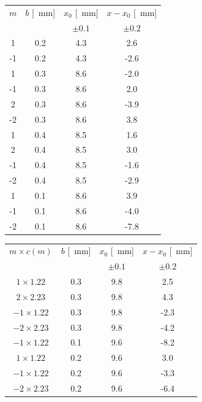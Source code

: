 \documentclass[10pt,oneside,a4paper]{article}
\begin{document}
\begin{minipage}[t]{.5\linewidth}
\vspace{0cm}
\begin{center}
\label{tab:misuraLambda1}
\begin{tabular}{c|c|c|c}
$m$ & $b$ [\SI{}{mm}] & $x_0$ [\SI{}{mm}] & $x-x_0$ [\SI{}{mm}]\\
 & & $\pm 0.1$ & $\pm 0.2$\\
\hline
  1 & 0.2 & 4.3 &  2.6 \\
 -1 & 0.2 & 4.3 & -2.6 \\
  1 & 0.3 & 8.6 & -2.0 \\
 -1 & 0.3 & 8.6 &  2.0 \\
  2 & 0.3 & 8.6 & -3.9 \\
 -2 & 0.3 & 8.6 &  3.8 \\
  1 & 0.4 & 8.5 &  1.6 \\
  2 & 0.4 & 8.5 &  3.0 \\
 -1 & 0.4 & 8.5 & -1.6 \\
 -2 & 0.4 & 8.5 & -2.9 \\
  1 & 0.1 & 8.6 &  3.9 \\
 -1 & 0.1 & 8.6 & -4.0 \\
 -2 & 0.1 & 8.6 & -7.8 \\
\hline
\end{tabular}
\end{center}
\end{minipage}
\quad
\begin{minipage}[t]{.5\linewidth}
\vspace{0cm}
\begin{center}
\label{tab:misuraLambda2}
\begin{tabular}{c|c|c|c}
$m \times c(m)$ & $b$ [\SI{}{mm}] & $x_0$ [\SI{}{mm}] & $x-x_0$ [\SI{}{mm}]\\
 & & $\pm 0.1$ & $\pm 0.2$\\
\hline
  $1 \times 1.22$ & 0.3 & 9.8 &  2.5 \\
  $2 \times 2.23$ & 0.3 & 9.8 &  4.3 \\
 $-1 \times 1.22$ & 0.3 & 9.8 & -2.3 \\
 $-2 \times 2.23$ & 0.3 & 9.8 & -4.2 \\
 $-1 \times 1.22$ & 0.1 & 9.6 & -8.2 \\
 $1 \times 1.22$ & 0.2 & 9.6 &  3.0 \\
 $-1 \times 1.22$ & 0.2 & 9.6 & -3.3 \\
 $-2 \times 2.23$ & 0.2 & 9.6 & -6.4 \\
\hline
\end{tabular}
\end{center}
\end{minipage}
\end{document}
